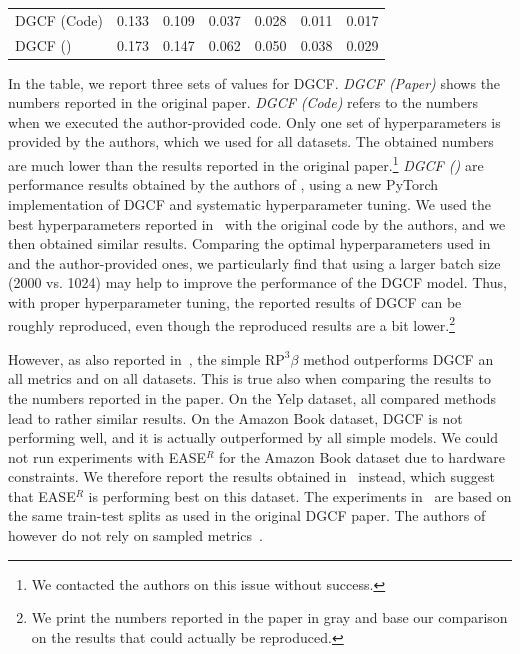 \documentclass[sigconf,natbib=true,nonacm]{acmart}
\newcommand{\pbeta}{\ensuremath{\text{RP}^3\!\beta}\xspace}
\newcommand{\easer}{EASE$^R$\xspace}
\begin{document}
\begin{table}[htbp]
\begin{tabular}{l l l l l l l}
        DGCF (Code)             & 0.133              & 0.109                                & 0.037                 & 0.028                           & 0.011                   & 0.017                 \\
        DGCF (\cite{Anelli2023Myth}) & 0.173         & 0.147                                & 0.062                  & 0.050                             & 0.038                    & 0.029                 \\

    \end{tabular}
\end{table}
In the table, we report three sets of values for DGCF. \emph{DGCF (Paper)} shows the numbers reported in the original paper. \emph{DGCF (Code)} refers to the numbers when we executed the author-provided code.
Only one set of hyperparameters is provided by the authors, which we used for all datasets. The obtained numbers are much lower than the results reported in the original paper.\footnote{We contacted the authors on this issue without success.}  \emph{DGCF (\cite{Anelli2023Myth})} are performance results obtained by the authors of \cite{Anelli2023Myth}, using a new PyTorch implementation of DGCF  and systematic hyperparameter tuning. We used the best hyperparameters reported in~\cite{Anelli2023Myth} with the original code by the authors, and we then obtained similar results. Comparing the optimal hyperparameters used in~\cite{Anelli2023Myth} and the author-provided ones, we particularly find that using a larger batch size (2000 vs. 1024) may help to improve the performance of the DGCF model. Thus, with proper hyperparameter tuning, the reported results of DGCF can be roughly reproduced, even though the reproduced results are a bit lower.\footnote{We print the numbers reported in the paper in gray and base our comparison on the results that could actually be reproduced.}

However, as also reported in~\cite{Anelli2023Myth}, the simple \pbeta method outperforms DGCF an all metrics and on all datasets. This is true also when comparing the results to the numbers reported in the paper. On the Yelp dataset, all compared methods lead to rather similar results. On the Amazon Book dataset, DGCF is not performing well, and it is actually outperformed by all simple models. We could not run experiments with \easer for the Amazon Book dataset due to hardware constraints. We therefore report the results obtained in~\cite{Zhu2022BARS} instead, which suggest that \easer is performing best on this dataset. The experiments in~\cite{Zhu2022BARS} are based on the same train-test splits as used in the original DGCF paper. The authors of~\cite{Zhu2022BARS} however do not rely on sampled metrics~\cite{Krichene2022Sampled}.
\end{document}
